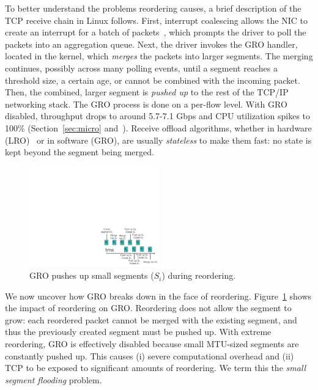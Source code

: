 To better understand the problems reordering causes, a brief description of  
the TCP receive chain in Linux follows. First, interrupt coalescing allows the NIC to create an interrupt for a batch of packets~\cite{mogul1997eliminating,understanding-linux-network},
which prompts the driver to poll the packets into an aggregation queue. Next, the driver
invokes the GRO handler, located in the kernel, which
{\em merges} the packets into larger segments. The merging continues,
possibly across many polling events, until a segment
reaches a threshold size, a certain age, or cannot be combined with the incoming packet. Then, the
combined, larger segment is {\em pushed up} to the rest of the TCP/IP networking stack. The GRO process is
done on a per-flow level. With GRO disabled, throughput drops to around
5.7-7.1 Gbps and CPU utilization spikes to 100\% (Section~\ref{sec:micro} and~\cite{bullettrains}). 
Receive offload algorithms, whether in hardware (LRO)~\cite{grossman2005large,open-lro} or in software (GRO), are usually
{\em stateless} to make them fast: no state is kept beyond the segment being merged.



\begin{figure}[!t]
        \centering
  \includegraphics[width=0.5\textwidth]{presto/figures/gro-design/gro-break.pdf}
        \caption{GRO pushes up small segments ($S_i$) during reordering.}
        \label{gro-break}
\end{figure}


We now uncover how GRO breaks down in the face of reordering. Figure~\ref{gro-break} shows the impact of reordering on GRO.  Reordering does not allow the segment to grow: each reordered packet cannot be merged with the existing segment, and thus the previously created segment must be pushed up. With extreme reordering, GRO is effectively disabled because small MTU-sized segments are constantly pushed up. This causes (i) severe computational overhead and (ii) TCP to be exposed to significant amounts of reordering. We term this the {\em small segment flooding} problem.

